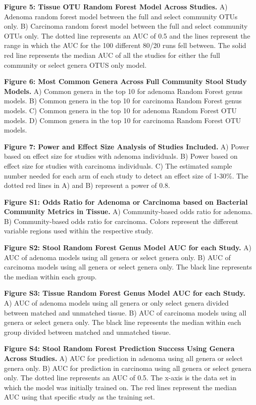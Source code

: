 \documentclass[12pt,]{article}
\begin{document}
\textbf{Figure 5: Tissue OTU Random Forest Model Across Studies.} A)
Adenoma random forest model between the full and select community OTUs
only. B) Carcinoma random forest model between the full and select
community OTUs only. The dotted line represents an AUC of 0.5 and the
lines represent the range in which the AUC for the 100 different 80/20
runs fell between. The solid red line represents the median AUC of all
the studies for either the full community or select genera OTUS only
model.

\textbf{Figure 6: Most Common Genera Across Full Community Stool Study
Models.} A) Common genera in the top 10 for adenoma Random Forest genus
models. B) Common genera in the top 10 for carcinoma Random Forest genus
models. C) Common genera in the top 10 for adenoma Random Forest OTU
models. D) Common genera in the top 10 for carcinoma Random Forest OTU
models.

\textbf{Figure 7: Power and Effect Size Analysis of Studies Included.}
A) Power based on effect size for studies with adenoma individuals. B)
Power based on effect size for studies with carcinoma individuals. C)
The estimated sample number needed for each arm of each study to detect
an effect size of 1-30\%. The dotted red lines in A) and B) represent a
power of 0.8.

\newpage

\textbf{Figure S1: Odds Ratio for Adenoma or Carcinoma based on
Bacterial Community Metrics in Tissue.} A) Community-based odds ratio
for adenoma. B) Community-based odds ratio for carcinoma. Colors
represent the different variable regions used within the respective
study.

\textbf{Figure S2: Stool Random Forest Genus Model AUC for each Study.}
A) AUC of adenoma models using all genera or select genera only. B) AUC
of carcinoma models using all genera or select genera only. The black
line represents the median within each group.

\textbf{Figure S3: Tissue Random Forest Genus Model AUC for each Study.}
A) AUC of adenoma models using all genera or only select genera divided
between matched and unmatched tissue. B) AUC of carcinoma models using
all genera or select genera only. The black line represents the median
within each group divided between matched and unmatched tissue.

\textbf{Figure S4: Stool Random Forest Prediction Success Using Genera
Across Studies.} A) AUC for prediction in adenoma using all genera or
select genera only. B) AUC for prediction in carcinoma using all genera
or select genera only. The dotted line represents an AUC of 0.5. The
x-axis is the data set in which the model was initially trained on. The
red lines represent the median AUC using that specific study as the
training set.
\end{document}
